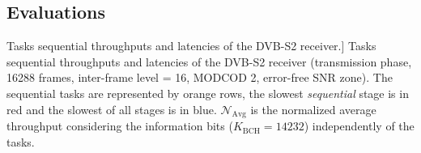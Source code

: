 \subsection{Evaluations}

\begin{table}[htp]
  \centering
  \caption
    [Tasks sequential throughputs and latencies of the DVB-S2 receiver.]
    {Tasks sequential throughputs and latencies of the DVB-S2 receiver
    (transmission phase, 16288 frames, inter-frame level = 16, MODCOD 2,
    error-free SNR zone).
    The sequential tasks are represented by \colorbox{Paired-7!15}{orange} rows,
    the slowest \emph{sequential} stage is in \colorbox{Paired-5!15}{red} and
    the slowest of all stages is in \colorbox{Paired-1!15}{blue}.
    $\mathcal{N}_\text{Avg}$ is the normalized average throughput
    considering the information bits ($K_\text{BCH} = 14232$) independently of
    the tasks.}
  \label{tab:dvbs2_tasks_thr_lat}
  {}
\end{table}
